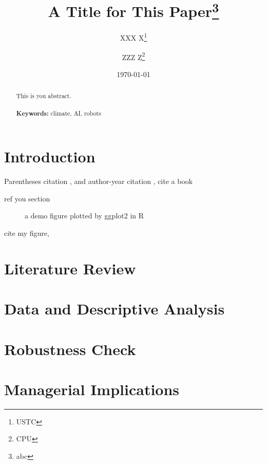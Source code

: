 \documentclass[a4paper, 12pt]{article}
\begin{document}
\begin{titlepage}
    \title{A Title for This Paper\thanks{abc}}
    \author{XXX X\thanks{USTC} \and ZZZ  Z\thanks{CPU}}
    \date{\today}
    \maketitle
    \begin{abstract}
        \noindent 
        This is you abstract.
        \\
        \vspace{0in}\\
        \noindent\textbf{Keywords:} climate, AI, robots\\
        \bigskip
    \end{abstract}
    \setcounter{page}{0}
    \thispagestyle{empty}
\end{titlepage}
\pagebreak \newpage
\doublespacing
\section{Introduction}\label{sec:intro}
Parentheses citation \citep{DunningHuchetteLubin2017,DunningHuchetteLubin2017}, and author-year citation \citet{DunningHuchetteLubin2017}, cite a book \citep[\S 2.1.1]{DunningHuchetteLubin2017}

ref you section 
\begin{figure}
\centering


\caption{a demo figure plotted by ggplot2 in R}
\label{fig:demo}
\end{figure}
cite my figure, 
\section{Literature Review}
\section{Data and Descriptive Analysis}
\section{Robustness Check}
\section{Managerial Implications}
\end{document}
